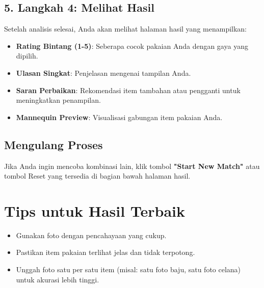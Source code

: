 \documentclass[a4paper,12pt]{article}
\begin{document}
\subsection{5. Langkah 4: Melihat Hasil}
Setelah analisis selesai, Anda akan melihat halaman hasil yang menampilkan:
\begin{itemize}
    \item \textbf{Rating Bintang (1-5)}: Seberapa cocok pakaian Anda dengan gaya yang dipilih.
    \item \textbf{Ulasan Singkat}: Penjelasan mengenai tampilan Anda.
    \item \textbf{Saran Perbaikan}: Rekomendasi item tambahan atau pengganti untuk meningkatkan penampilan.
    \item \textbf{Mannequin Preview}: Visualisasi gabungan item pakaian Anda.
\end{itemize}

\subsection{Mengulang Proses}
Jika Anda ingin mencoba kombinasi lain, klik tombol \textbf{"Start New Match"} atau tombol Reset yang tersedia di bagian bawah halaman hasil.

\section{Tips untuk Hasil Terbaik}
\begin{itemize}
    \item Gunakan foto dengan pencahayaan yang cukup.
    \item Pastikan item pakaian terlihat jelas dan tidak terpotong.
    \item Unggah foto satu per satu item (misal: satu foto baju, satu foto celana) untuk akurasi lebih tinggi.
\end{itemize}
\end{document}
